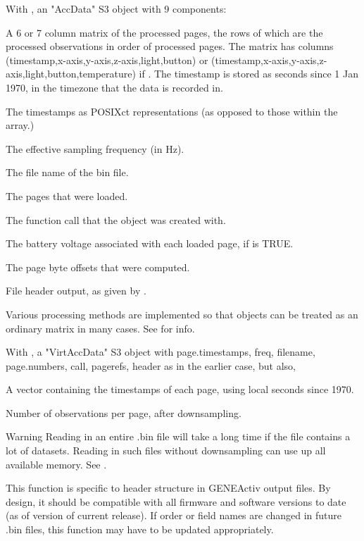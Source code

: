 \documentclass[a4paper]{book}
\begin{document}
%
\begin{Value}
With , an "AccData" S3 object with 9 components:
\begin{ldescription}
\item[\code{data.out}] A 6 or 7 column matrix of the processed pages, the rows of which are the processed observations in order of processed pages.  The matrix has columns (timestamp,x-axis,y-axis,z-axis,light,button) or (timestamp,x-axis,y-axis,z-axis,light,button,temperature) if . The timestamp is stored as seconds since 1 Jan 1970, in the timezone that the data is recorded in.
\item[\code{page.timestamps}] The timestamps as POSIXct representations (as opposed to those within the  array.)
\item[\code{freq}] The effective sampling frequency (in Hz).
\item[\code{filename}] The file name of the bin file.
\item[\code{page.numbers}] The pages that were loaded.
\item[\code{call}] The function call that the object was created with.
\item[\code{page.volts}] The battery voltage associated with each loaded page, if  is TRUE.
\item[\code{pagerefs}] The page byte offsets that were computed.
\item[\code{header}] File header output, as given by .

\end{ldescription}
Various processing methods are implemented so that  objects can be treated as an ordinary matrix in many cases. See  for info.

With , a "VirtAccData" S3 object with page.timestamps, freq, filename, page.numbers, call, pagerefs, header as in the earlier case, but also,
\begin{ldescription}
\item[\code{data.out}] A vector containing the timestamps of each page, using local seconds since 1970.
\item[\code{nobs}] Number of observations per page, after downsampling.
\end{ldescription}
\end{Value}
%
\begin{Section}{Warning}
Reading in an entire .bin file will take a long time if the file contains a lot of datasets. Reading in such files without downsampling can use up all available memory. See .

This function is specific to header structure in GENEActiv output files. By design, it should be compatible with all firmware and software versions to date (as of version of current release). If order or field names are changed in future .bin files, this function may have to be updated appropriately.
\end{Section}
\end{document}
